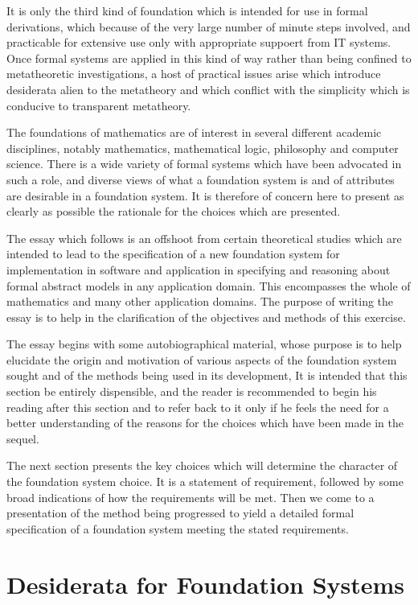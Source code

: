 \documentclass[numreferences]{rbjk}
\begin{document}
\begin{article}
It is only the third kind of foundation which is intended for use in formal derivations, which because of the very large number of minute steps involved, and practicable for extensive use only with appropriate suppoert from IT systems.
Once formal systems are applied in this kind of way rather than being confined to metatheoretic investigations, a host of practical issues arise which introduce desiderata alien to the metatheory and which conflict with the simplicity which is conducive to transparent metatheory.

The foundations of mathematics are of interest in several different academic disciplines, notably mathematics, mathematical logic, philosophy and computer science.
There is a wide variety of formal systems which have been advocated in such a role, and diverse views of what a foundation system is and of attributes are desirable in a foundation system.
It is therefore of concern here to present as clearly as possible the rationale for the choices which are presented.

The essay which follows is an offshoot from certain theoretical studies which are intended to lead to the specification of a new foundation system for implementation in software and application in specifying and reasoning about formal abstract models in any application domain.
This encompasses the whole of mathematics and many other application domains.
The purpose of writing the essay is to help in the clarification of the objectives and methods of this exercise.

The essay begins with some autobiographical material, whose purpose is to help elucidate the origin and motivation of various aspects of the foundation system sought and of the methods being used in its development,
It is intended that this section be entirely dispensible, and the reader is recommended to begin his reading after this section and to refer back to it only if he feels the need for a better understanding of the reasons for the choices which have been made in the sequel.

The next section presents the key choices which will determine the character of the foundation system choice.
It is a statement of requirement, followed by some broad indications of how the requirements will be met.
Then we come to a presentation of the method being progressed to yield a detailed formal specification of a foundation system meeting the stated requirements.

\section{Desiderata for Foundation Systems}


\end{article}
\end{document}
